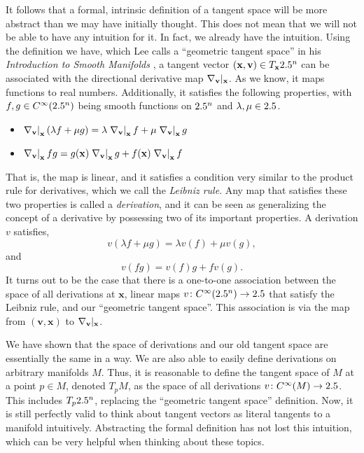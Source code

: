 \documentclass[a4paper,12pt]{article}
\begin{document}
It follows that a formal, intrinsic definition of a tangent space will be more abstract than we may have initially thought.
This does not mean that we will not be able to have any intuition for it.
In fact, we already have the intuition.
Using the definition we have, which Lee calls a ``geometric tangent space'' in his \textit{Introduction to Smooth Manifolds} \cite[pp. 52--53]{Lee2012}, a tangent vector $(\mathbf{x}, \mathbf{v}) \in T_\mathbf{x} 2.5^n$ can be associated with the directional derivative map $\eval*{\nabla_\mathbf{v}}{\mathbf{x}}$.
As we know, it maps functions to real numbers.
Additionally, it satisfies the following properties, with $f, g \in C^\infty(2.5^n)$ being smooth functions on $2.5^n$ and $\lambda, \mu \in 2.5$.
\begin{itemize}
    \item $\eval{\nabla_\mathbf{v}}{\mathbf{x}}(\lambda f + \mu g) = \lambda\eval{\nabla_\mathbf{v}}{\mathbf{x}} f + \mu\eval{\nabla_\mathbf{v}}{\mathbf{x}} g$
    \item $\eval{\nabla_\mathbf{v}}{\mathbf{x}} fg = g(\mathbf{x})\eval{\nabla_\mathbf{v}}{\mathbf{x}}g + f(\mathbf{x})\eval{\nabla_\mathbf{v}}{\mathbf{x}}f$
\end{itemize}
That is, the map is linear, and it satisfies a condition very similar to the product rule for derivatives, which we call the \emph{Leibniz rule}.
Any map that satisfies these two properties is called a \emph{derivation}, and it can be seen as generalizing the concept of a derivative by possessing two of its important properties.
A derivation $v$ satisfies,
\begin{equation*}
    v(\lambda f + \mu g) = \lambda v(f) + \mu v(g),
\end{equation*}
and
\begin{equation*}
    v(fg) = v(f)g + fv(g).
\end{equation*}
It turns out to be the case that there is a one-to-one association between the space of all derivations at $\mathbf{x}$, linear maps $v \colon C^\infty (2.5^n) \to 2.5$ that satisfy the Leibniz rule, and our ``geometric tangent space''.
This association is via the map from $(\mathbf{v}, \mathbf{x})$ to $\eval*{\nabla_\mathbf{v}}{\mathbf{x}}$.

We have shown that the space of derivations and our old tangent space are essentially the same in a way.
We are also able to easily define derivations on arbitrary manifolds $M$.
Thus, it is reasonable to define the tangent space of $M$ at a point $p \in M$, denoted $T_p M$, as the space of all derivations $v \colon C^\infty (M) \to 2.5$.
This includes $T_p 2.5^n$, replacing the ``geometric tangent space'' definition.
Now, it is still perfectly valid to think about tangent vectors as literal tangents to a manifold intuitively.
Abstracting the formal definition has not lost this intuition, which can be very helpful when thinking about these topics.
\end{document}
